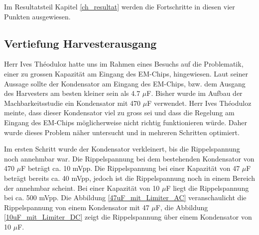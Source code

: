 Im Resultatsteil Kapitel \ref{ch_resultat} werden die Fortschritte in diesen vier Punkten ausgewiesen.

\subsection{Vertiefung Harvesterausgang}\label{auffaellig} 

Herr Ives Théoduloz hatte uns im Rahmen eines Besuchs auf die Problematik, einer zu grossen Kapazität am Eingang des EM-Chips, hingewiesen. Laut seiner Aussage sollte der Kondensator am Eingang des EM-Chips, bzw. dem Ausgang des Harvesters am besten kleiner sein als 4.7 $\mu$F. Bisher wurde im Aufbau der Machbarkeitsstudie ein Kondensator mit 470 $\mu$F verwendet. Herr Ives Théoduloz meinte, dass dieser Kondensator viel zu gross sei und dass die Regelung am Eingang des EM-Chips möglicherweise nicht richtig funktionieren würde. Daher wurde dieses Problem näher untersucht und in mehreren Schritten optimiert.

Im ersten Schritt wurde der Kondensator verkleinert, bis die Rippelspannung noch annehmbar war. Die Rippelspannung bei dem bestehenden Kondensator von 470 $\mu$F beträgt ca. 10 mVpp. Die Rippelspannung bei einer Kapazität von 47 $\mu$F beträgt bereits ca. 40 mVpp, jedoch ist die Rippelspannung noch in einem Bereich der annehmbar scheint. Bei einer Kapazität von 10 $\mu$F liegt die Rippelspannung bei ca. 500 mVpp. Die Abbildung \ref{47uF_mit_Limiter_AC} veranschaulicht die Rippelspannung von einem Kondensator mit 47 $\mu$F, die Abbildung \ref{10uF_mit_Limiter_DC} zeigt die Rippelspannung über einem Kondensator von 10 $\mu$F.

